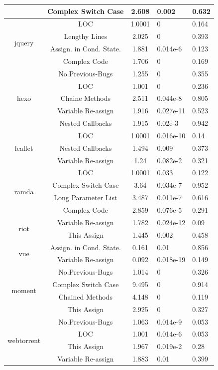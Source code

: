 \begin{table}[t]
\begin{tabular}{c|c|c|p{1.1cm}|p{1.3cm}}
 & Complex Switch Case & 2.608 & 0.002 & 0.632 \\ \hline
\multirow{4}{*}{jquery}
 & LOC & 1.0001 & 0 & 0.164 \\ \cline{2-5}
 & Lengthy Lines & 2.025 & 0 & 0.393 \\ \cline{2-5}
 & Assign. in Cond. State. & 1.881 & 0.014e-6 & 0.123 \\ \cline{2-5}
 & Complex Code & 1.706 & 0 & 0.169 \\ \hline
\multirow{5}{*}{hexo}
 & No.Previous-Bugs & 1.255 & 0 & 0.355 \\ \cline{2-5}
 & LOC & 1.001 & 0 & 0.236 \\ \cline{2-5}
 & Chaine Methods & 2.511 & 0.044e-8 & 0.805 \\ \cline{2-5}
 & Variable Re-assign & 1.916 & 0.027e-11 & 0.523 \\ \cline{2-5}
 & Nested Callbacks & 1.915 & 0.02e-3 & 0.942 \\ \hline
\multirow{3}{*}{leaflet}
 & LOC & 1.0001 & 0.016e-10 & 0.14 \\ \cline{2-5}
 & Nested Callbacks & 1.494 & 0.009 & 0.373 \\ \cline{2-5}
 & Variable Re-assign & 1.24 & 0.082e-2 & 0.321 \\ \hline
\multirow{4}{*}{ramda}
 & LOC & 1.0001 & 0.033 & 0.122 \\ \cline{2-5}
 & Complex Switch Case & 3.64 & 0.034e-7 & 0.952 \\ \cline{2-5}
 & Long Parameter List & 3.487 & 0.011e-7 & 0.616 \\ \cline{2-5}
 & Complex Code & 2.859 & 0.076e-5 & 0.291 \\ \hline
\multirow{2}{*}{riot}
 & Variable Re-assign & 1.782 & 0.024e-12 & 0.09 \\ \cline{2-5}
 & This Assign & 1.445 & 0.002 & 0.458 \\ \hline
\multirow{2}{*}{vue}
 & Assign. in Cond. State. & 0.161 & 0.01 & 0.856 \\ \cline{2-5}
 & Variable Re-assign & 0.092 & 0.018e-19 & 0.149 \\ \hline
\multirow{4}{*}{moment}
 & No.Previous-Bugs & 1.014 & 0 & 0.326 \\ \cline{2-5}
 & Complex Switch Case & 9.495 & 0 & 0.914 \\ \cline{2-5}
 & Chained Methods & 4.148 & 0 & 0.119 \\ \cline{2-5}
 & This Assign & 2.925 & 0 & 0.327 \\ \hline
\multirow{4}{*}{webtorrent}
 & No.Previous-Bugs & 1.063 & 0.014e-9 & 0.053 \\ \cline{2-5}
 & LOC & 1.001 & 0.014e-6 & 0.053 \\ \cline{2-5}
 & This Assign & 1.967 & 0.019e-2 & 0.28 \\ \cline{2-5}
 & Variable Re-assign & 1.883 & 0.01 & 0.399 \\ \hline
\end{tabular}
\label{smelltypes}
\vspace{-15pt}
\end{table}

